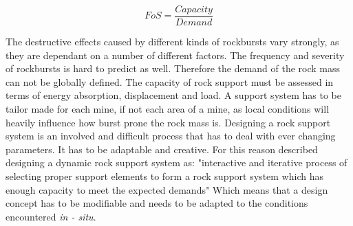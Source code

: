 \begin{equation}
\label{equ:FoS}
FoS = \frac{Capacity}{Demand}
\end{equation}


The destructive effects caused by different kinds of rockbursts vary strongly, as they are dependant on a number of different factors. The frequency and severity of rockbursts is hard to predict as well. Therefore the demand of the rock mass can not be globally defined. \autocite[8.6]{canada96}
The capacity of rock support must be assessed in terms of energy absorption, displacement and load. \autocite[221]{Kaiser12} 
A support system has to be tailor made for each mine, if not each area of a mine, as local conditions will heavily influence how burst prone the rock mass is. Designing a rock support system is an involved and difficult process that has to deal with ever changing parameters. It has to be adaptable and creative. \autocite[223]{Kaiser12} For this reason \textcite[216]{Kaiser12} described designing a dynamic rock support system as: "interactive and iterative process of selecting proper support elements to form a rock support system which has enough capacity to meet the expected demands" Which means that a design concept has to be modifiable and needs to be adapted to the conditions encountered \textit{in - situ}.


